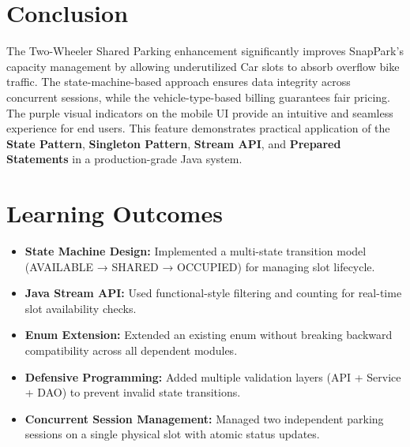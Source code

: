 \documentclass[12pt,a4paper]{article}
\begin{document}
\section{Conclusion}

The Two-Wheeler Shared Parking enhancement significantly improves SnapPark's capacity management by allowing underutilized Car slots to absorb overflow bike traffic. The state-machine-based approach ensures data integrity across concurrent sessions, while the vehicle-type-based billing guarantees fair pricing. The purple visual indicators on the mobile UI provide an intuitive and seamless experience for end users. This feature demonstrates practical application of the \textbf{State Pattern}, \textbf{Singleton Pattern}, \textbf{Stream API}, and \textbf{Prepared Statements} in a production-grade Java system.

\section{Learning Outcomes}

\begin{itemize}
    \item \textbf{State Machine Design:} Implemented a multi-state transition model (AVAILABLE → SHARED → OCCUPIED) for managing slot lifecycle.
    \item \textbf{Java Stream API:} Used functional-style filtering and counting for real-time slot availability checks.
    \item \textbf{Enum Extension:} Extended an existing enum without breaking backward compatibility across all dependent modules.
    \item \textbf{Defensive Programming:} Added multiple validation layers (API + Service + DAO) to prevent invalid state transitions.
    \item \textbf{Concurrent Session Management:} Managed two independent parking sessions on a single physical slot with atomic status updates.
\end{itemize}
\end{document}
